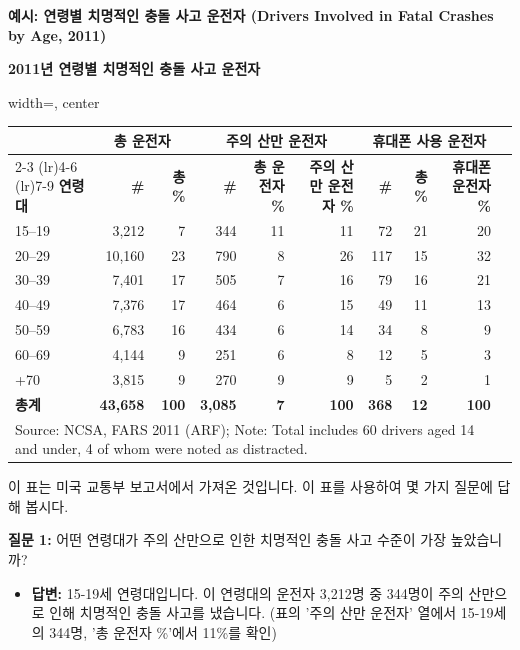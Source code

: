 \documentclass[11pt,a4paper]{book}
\providecommand{\captionof}[2]{\textbf{#2}}
\theoremstyle{definition}
\begin{document}
\begin{examplebox}
\textbf{예시: 연령별 치명적인 충돌 사고 운전자 (Drivers Involved in Fatal Crashes by Age, 2011)}

\begin{center}
\captionof{table}{2011년 연령별 치명적인 충돌 사고 운전자}
\label{tab:fatal_crashes}
\begin{adjustbox}{width=\textwidth, center}
\begin{tabular}{lrrrrrrrrr}
\toprule
& \multicolumn{2}{c}{\textbf{총 운전자}} & \multicolumn{3}{c}{\textbf{주의 산만 운전자}} & \multicolumn{3}{c}{\textbf{휴대폰 사용 운전자}} \\
\cmidrule(lr){2-3} \cmidrule(lr){4-6} \cmidrule(lr){7-9}
\textbf{연령대} & \textbf{\#} & \textbf{총 \%} & \textbf{\#} & \textbf{총 운전자 \%} & \textbf{주의 산만 운전자 \%} & \textbf{\#} & \textbf{총 \%} & \textbf{휴대폰 운전자 \%} \\
\midrule
15–19 & 3,212 & 7 & 344 & 11 & 11 & 72 & 21 & 20 \\
20–29 & 10,160 & 23 & 790 & 8 & 26 & 117 & 15 & 32 \\
30–39 & 7,401 & 17 & 505 & 7 & 16 & 79 & 16 & 21 \\
40–49 & 7,376 & 17 & 464 & 6 & 15 & 49 & 11 & 13 \\
50–59 & 6,783 & 16 & 434 & 6 & 14 & 34 & 8 & 9 \\
60–69 & 4,144 & 9 & 251 & 6 & 8 & 12 & 5 & 3 \\
+70 & 3,815 & 9 & 270 & 9 & 9 & 5 & 2 & 1 \\
\midrule
\textbf{총계} & \textbf{43,658} & \textbf{100} & \textbf{3,085} & \textbf{7} & \textbf{100} & \textbf{368} & \textbf{12} & \textbf{100} \\
\bottomrule
\multicolumn{9}{l}{\small Source: NCSA, FARS 2011 (ARF); Note: Total includes 60 drivers aged 14 and under, 4 of whom were noted as distracted.} \\
\end{tabular}
\end{adjustbox}
\end{center}
이 표는 미국 교통부 보고서에서 가져온 것입니다. 이 표를 사용하여 몇 가지 질문에 답해 봅시다.

\textbf{질문 1:} 어떤 연령대가 주의 산만으로 인한 치명적인 충돌 사고 수준이 가장 높았습니까?
\begin{itemize}
    \item \textbf{답변:} 15-19세 연령대입니다. 이 연령대의 운전자 3,212명 중 344명이 주의 산만으로 인해 치명적인 충돌 사고를 냈습니다. (표의 '주의 산만 운전자' 열에서 15-19세의 344명, '총 운전자 \%'에서 11\%를 확인)
\end{itemize}


\end{examplebox}
\end{document}
